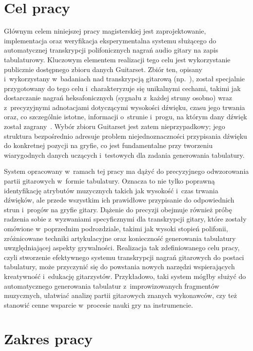 \section{Cel pracy}
\label{sec:cel_pracy}

Głównym celem niniejszej pracy magisterskiej jest zaprojektowanie, implementacja oraz weryfikacja eksperymentalna systemu służącego do automatycznej transkrypcji polifonicznych nagrań audio gitary na zapis tabulaturowy. Kluczowym elementem realizacji tego celu jest wykorzystanie publicznie dostępnego zbioru danych Guitarset. Zbiór ten, opisany i~wykorzystany w~badaniach nad transkrypcją gitarową (np.~\autocite{Wiggins2019TabCNN}), został specjalnie przygotowany do tego celu i~charakteryzuje się unikalnymi cechami, takimi jak dostarczanie nagrań heksafonicznych (sygnału z~każdej struny osobno) wraz z~precyzyjnymi adnotacjami dotyczącymi wysokości dźwięku, czasu jego trwania oraz, co szczególnie istotne, informacji o~strunie i~progu, na którym dany dźwięk został zagrany~\autocite{Wiggins2019TabCNN}. Wybór zbioru Guitarset jest zatem nieprzypadkowy; jego struktura bezpośrednio adresuje problem niejednoznaczności przypisania dźwięku do konkretnej pozycji na gryfie, co jest fundamentalne przy tworzeniu wiarygodnych danych uczących i~testowych dla zadania generowania tabulatury.

System opracowany w~ramach tej pracy ma dążyć do precyzyjnego odwzorowania partii gitarowych w~formie tabulatury. Oznacza to nie tylko poprawną identyfikację atrybutów muzycznych takich jak wysokość i~czas trwania dźwięków, ale przede wszystkim ich prawidłowe przypisanie do odpowiednich strun i~progów na gryfie gitary. Dążenie do precyzji obejmuje również próbę radzenia sobie z~wyzwaniami specyficznymi dla transkrypcji gitary, które zostały omówione w~poprzednim podrozdziale, takimi jak wysoki stopień polifonii, zróżnicowane techniki artykulacyjne oraz konieczność generowania tabulatury uwzględniającej aspekty grywalności. Realizacja tak zdefiniowanego celu pracy, czyli stworzenie efektywnego systemu transkrypcji nagrań gitarowych do postaci tabulatury, może przyczynić się do powstania nowych narzędzi wspierających kreatywność i~edukację gitarzystów. Przykładowo, taki system mógłby służyć do automatycznego generowania tabulatur z~improwizowanych fragmentów muzycznych, ułatwiać analizę partii gitarowych znanych wykonawców, czy też stanowić cenne wsparcie w~procesie nauki gry na instrumencie.

\section{Zakres pracy}
\label{sec:zakres_pracy}

